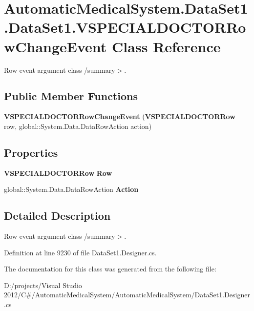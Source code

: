 \section{AutomaticMedicalSystem.DataSet1.DataSet1.VSPECIALDOCTORRowChangeEvent Class Reference}
\label{class_automatic_medical_system_1_1_data_set1_1_1_v_s_p_e_c_i_a_l_d_o_c_t_o_r_row_change_event}
Row event argument class /summary$>$.  


\subsection*{Public Member Functions}
\begin{CompactItemize}
\item 
\textbf{VSPECIALDOCTORRowChangeEvent} ({\bf VSPECIALDOCTORRow} row, global::System.Data.DataRowAction action)\label{class_automatic_medical_system_1_1_data_set1_1_1_v_s_p_e_c_i_a_l_d_o_c_t_o_r_row_change_event_e8414ad5219c90129e27cc43edc22faa}

\end{CompactItemize}
\subsection*{Properties}
\begin{CompactItemize}
\item 
{\bf VSPECIALDOCTORRow} \textbf{Row}\hspace{0.3cm}{\tt  [get]}\label{class_automatic_medical_system_1_1_data_set1_1_1_v_s_p_e_c_i_a_l_d_o_c_t_o_r_row_change_event_28f59e5197b231d1e978b518f886ba47}

\item 
global::System.Data.DataRowAction \textbf{Action}\hspace{0.3cm}{\tt  [get]}\label{class_automatic_medical_system_1_1_data_set1_1_1_v_s_p_e_c_i_a_l_d_o_c_t_o_r_row_change_event_0af33d27a191e32941a3acd8540550a5}

\end{CompactItemize}


\subsection{Detailed Description}
Row event argument class /summary$>$. 

Definition at line 9230 of file DataSet1.Designer.cs.

The documentation for this class was generated from the following file:\begin{CompactItemize}
\item 
D:/projects/Visual Studio 2012/C\#/AutomaticMedicalSystem/AutomaticMedicalSystem/DataSet1.Designer.cs\end{CompactItemize}
